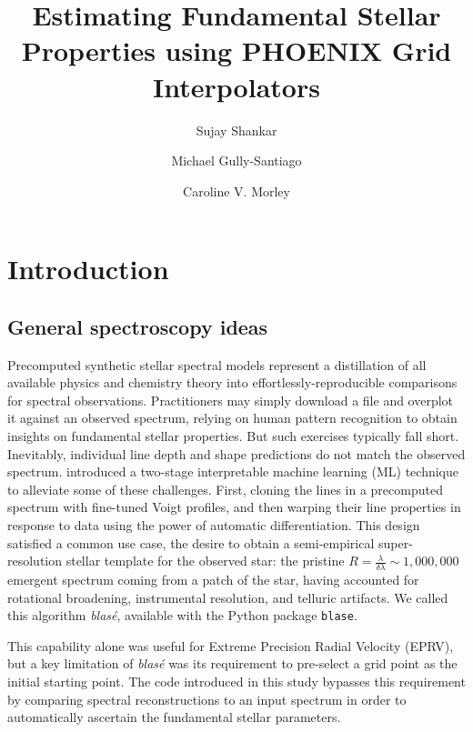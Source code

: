 \documentclass[twocolumn]{aastex631}
\begin{document}
\title{Estimating Fundamental Stellar Properties using PHOENIX Grid Interpolators}

\author[0000-0002-2290-6810]{Sujay Shankar}
\author[0000-0002-4020-3457]{Michael Gully-Santiago}
\author[0000-0002-4404-0456]{Caroline V. Morley}

\begin{abstract}
    \blindtext
\end{abstract}

\keywords{}


\section{Introduction}



\subsection{General spectroscopy ideas}

Precomputed synthetic stellar spectral models represent a distillation of all available physics
and chemistry theory into effortlessly-reproducible comparisons for spectral observations.
Practitioners may simply download a file and overplot it against an observed spectrum, relying on
human pattern recognition to obtain insights on fundamental stellar properties. But such exercises
typically fall short. Inevitably, individual line depth and shape predictions do not match the
observed spectrum. \citet{2022ApJ...941..200G} introduced a two-stage interpretable machine learning (ML)
technique to alleviate some of these challenges. First, cloning the lines in a precomputed spectrum
with fine-tuned Voigt profiles, and then warping their line properties in response to data using
the power of automatic differentiation. This design satisfied a common use case, the desire to
obtain a semi-empirical super-resolution stellar template for the observed star: the pristine
$R=\frac{\lambda}{\delta \lambda}\sim1,000,000$ emergent spectrum coming from a patch of the star,
having accounted for rotational broadening, instrumental resolution, and telluric artifacts.
We called this algorithm \emph{blas\'e}, available with the Python package \texttt{blase}.

This capability alone was useful for Extreme Precision Radial Velocity (EPRV), but a key limitation
of \emph{blas\'e} was its requirement to pre-select a grid point as the initial starting point. The code
introduced in this study bypasses this requirement by comparing spectral reconstructions to an input
spectrum in order to automatically ascertain the fundamental stellar parameters.
\end{document}
